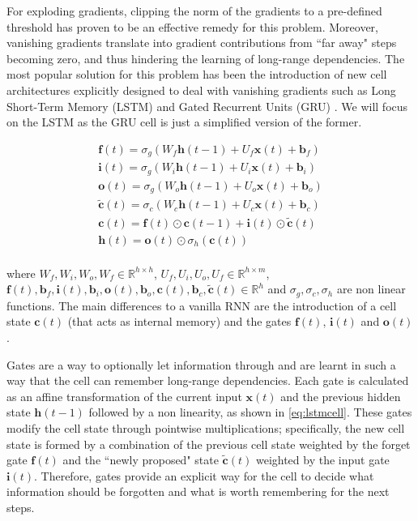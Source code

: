 For exploding gradients, clipping the norm of the gradients to a pre-defined threshold has proven to be an effective remedy for this problem. Moreover, vanishing gradients translate into gradient contributions from ``far away" steps becoming zero, and thus hindering the learning of long-range dependencies. The most popular solution for this problem has been the introduction of new cell architectures explicitly designed to deal with vanishing gradients such as Long Short-Term Memory (LSTM) \cite{hochreiter1997long} and Gated Recurrent Units (GRU) \cite{cho2014learning}. We will focus on the LSTM as the GRU cell is just a simplified version of the former.

\begin{equation} \label{eq:lstmcell}
	\begin{gathered}
		\mathbf{f}(t) = \sigma_g(W_f \mathbf{h}(t-1) + U_f\mathbf{x}(t) + \mathbf{b}_f) \\
		\mathbf{i}(t) = \sigma_g(W_i \mathbf{h}(t-1) + U_i \mathbf{x}(t) + \mathbf{b}_i) \\
		\mathbf{o}(t) = \sigma_g(W_o \mathbf{h}(t-1) + U_o \mathbf{x}(t) + \mathbf{b}_o) \\
		\mathbf{\tilde{c}}(t) = \sigma_c(W_c \mathbf{h}(t-1) + U_c \mathbf{x}(t) + \mathbf{b}_c) \\
		\mathbf{c}(t) = \mathbf{f}(t) \odot \mathbf{c}(t-1) + \mathbf{i}(t) \odot \mathbf{\tilde{c}}(t) \\
		\mathbf{h}(t) = \mathbf{o}(t) \odot \sigma_h(\mathbf{c}(t))\\
	\end{gathered}
\end{equation}

where $W_f,W_i,W_o,W_f \in \mathbb{R}^{h \times h}$, $U_f,U_i,U_o,U_f \in \mathbb{R}^{h \times m}$, $\mathbf{f}(t),\mathbf{b}_f,\mathbf{i}(t),\mathbf{b}_i,  \allowbreak \mathbf{o}(t),\mathbf{b}_o,\mathbf{c}(t),\mathbf{b}_c,\mathbf{\tilde{c}}(t) \in \mathbb{R}^{h}$ and $\sigma_g,\sigma_c,\sigma_h$ are non linear functions. The main differences to a vanilla RNN are the introduction of a cell state $\mathbf{c}(t)$ (that acts as internal memory) and the gates $\mathbf{f}(t)$, $\mathbf{i}(t)$ and $\mathbf{o}(t)$. 

Gates are a way to optionally let information through and are learnt in such a way that the cell can remember long-range dependencies. Each gate is calculated as an affine transformation of the current input $\mathbf{x}(t)$ and the previous hidden state $\mathbf{h}(t-1)$ followed by a non linearity, as shown in \autoref{eq:lstmcell}. These gates modify the cell state through pointwise multiplications; specifically, the new cell state is formed by a combination of the previous cell state weighted by the forget gate $\mathbf{f}(t)$ and the ``newly proposed" state $\mathbf{\tilde{c}}(t)$ weighted by the input gate $\mathbf{i}(t)$. Therefore, gates provide an explicit way for the cell to decide what information should be forgotten and what is worth remembering for the next steps.  

